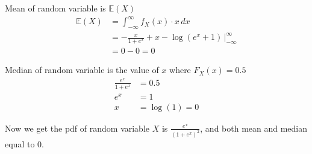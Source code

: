 \documentclass[12pt,letterpaper]{article}
\begin{document}
\noindent Mean of random variable is $\mathbb{E}(X)$
\begin{align*}
\mathbb{E}(X) &= \int_{-\infty}^{\infty} f_X(x) \cdot x \, dx \\
&= - \frac{x}{1 + e^x} + x - \log(e^x + 1) \, |_{-\infty}^{\infty}\\
&= 0 - 0 = 0
\end{align*}

\noindent Median of random variable is the value of $x$ where $F_X(x) = 0.5$
\begin{align*}
\frac{e^x}{1 + e^x} &= 0.5 \\
e^x &= 1 \\
x &= \log(1) = 0
\end{align*}

\noindent Now we get the pdf of random variable $X$ is $\frac{e^x}{(1+e^x)^2}$, and both mean and median equal to 0.


\end{document}

